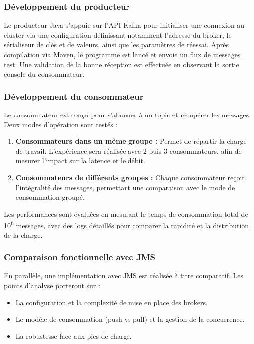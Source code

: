 \subsubsection{Développement du producteur}
Le producteur Java s’appuie sur l’API Kafka pour initialiser une connexion au cluster via une configuration définissant notamment l’adresse du broker, le sérialiseur de clés et de valeurs, ainsi que les paramètres de réessai. Après compilation via Maven, le programme est lancé et envoie un flux de messages test. Une validation de la bonne réception est effectuée en observant la sortie console du consommateur.

\subsubsection{Développement du consommateur}
Le consommateur est conçu pour s’abonner à un topic et récupérer les messages.
Deux modes d’opération sont testés :
\begin{enumerate}
    \item \textbf{Consommateurs dans un même groupe :} Permet de répartir la charge de travail.
    L’expérience sera réalisée avec 2 puis 3 consommateurs, afin de mesurer l’impact sur la latence et le débit.
    \item \textbf{Consommateurs de différents groupes :} Chaque consommateur reçoit l’intégralité des messages, permettant une comparaison avec le mode de consommation groupé.
\end{enumerate}

Les performances sont évaluées en mesurant le temps de consommation total de 10\textsuperscript{6} messages, avec des logs détaillés pour comparer la rapidité et la distribution de la charge.

\subsubsection{Comparaison fonctionnelle avec JMS}
En parallèle, une implémentation avec JMS est réalisée à titre comparatif. Les points d’analyse porteront sur :
\begin{itemize}
    \item La configuration et la complexité de mise en place des brokers.
    \item Le modèle de consommation (push vs pull) et la gestion de la concurrence.
    \item La robustesse face aux pics de charge.
\end{itemize}

